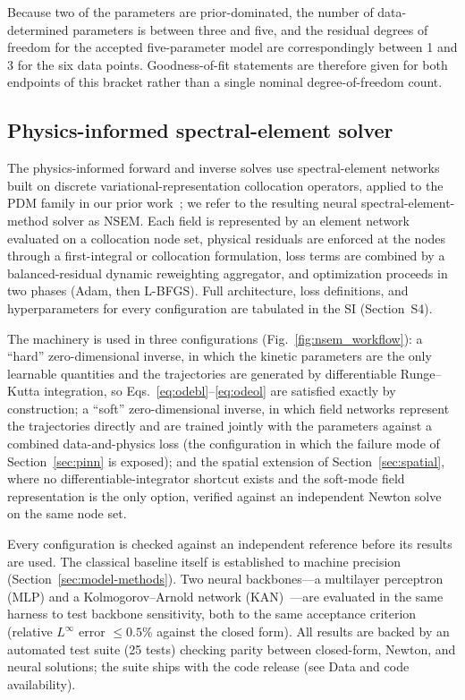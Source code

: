\documentclass[preprint,12pt]{elsarticle}
\begin{document}
Because two of the parameters are prior-dominated, the number of
data-determined parameters is between three and five, and the residual
degrees of freedom for the accepted five-parameter model are
correspondingly between 1 and 3 for the six data points. Goodness-of-fit
statements are therefore given for both endpoints of this
bracket rather than a single nominal degree-of-freedom count.

\subsection{Physics-informed spectral-element solver}\label{sec:nsem}

The physics-informed forward and inverse solves use spectral-element
networks built on discrete variational-representation collocation
operators, applied to the PDM family in our prior
work~\citep{farooqi2025pinnpdm}; we refer to the resulting neural
spectral-element-method solver as NSEM. Each field is represented by an
element network evaluated on a collocation node set, physical residuals
are enforced at the nodes through a first-integral or collocation
formulation, loss terms are combined by a balanced-residual dynamic
reweighting aggregator, and optimization proceeds in two phases (Adam,
then L-BFGS). Full architecture, loss definitions, and hyperparameters
for every configuration are tabulated in the SI (Section~S4).

The machinery is used in three configurations
(Fig.~\ref{fig:nsem_workflow}): a ``hard'' zero-dimensional inverse, in
which the kinetic parameters are the only learnable quantities and the
trajectories are generated by differentiable Runge--Kutta integration,
so Eqs.~\eqref{eq:odebl}--\eqref{eq:odeol} are satisfied exactly by
construction; a ``soft'' zero-dimensional inverse, in which field
networks represent the trajectories directly and are trained jointly
with the parameters against a combined data-and-physics loss (the
configuration in which the failure mode of Section~\ref{sec:pinn} is
exposed); and the spatial extension of Section~\ref{sec:spatial}, where
no differentiable-integrator shortcut exists and the soft-mode field
representation is the only option, verified against an independent
Newton solve on the same node set.

Every configuration is checked against an independent reference before
its results are used. The classical baseline itself is established
to machine precision (Section~\ref{sec:model-methods}). Two
neural backbones---a multilayer perceptron (MLP) and a
Kolmogorov--Arnold network (KAN)~\citep{liu2024kan}---are evaluated in
the same harness to test backbone sensitivity, both to the same
acceptance criterion (relative $L^\infty$ error $\le0.5\%$ against the
closed form). All results are backed by an automated test suite (25
tests) checking parity between closed-form, Newton, and neural
solutions; the suite ships with the code release (see Data and code
availability).
\end{document}
